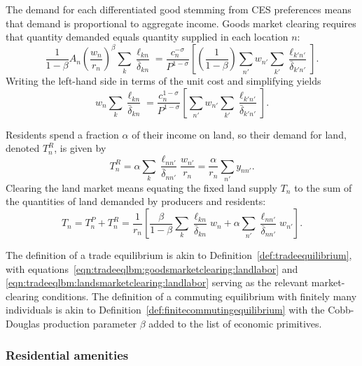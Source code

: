 \documentclass[11pt]{article}
\theoremstyle{definition}
\begin{document}
The demand for each differentiated good stemming from CES preferences means that
demand is proportional to aggregate income.
Goods market clearing requires that quantity demanded equals quantity supplied in each location $n$:
\begin{equation*}
    \frac{1}{1-\beta} A_n \left(\frac{w_n}{r_n}\right)^{\beta} \sum_k \frac{\ell_{kn}}{\bar{\delta}_{kn}}
    =
    \frac{c_n^{-\sigma}}{P^{1-\sigma}} \left[\left(\frac{1}{1-\beta}\right) \sum_{n'} w_{n'} \sum_{k'} \frac{\ell_{k'n'}}{\bar{\delta}_{k'n'}} \right].
\end{equation*}
Writing the left-hand side in terms of the unit cost and simplifying yields
\begin{equation}
	\label{eqn:tradeeqlbm:goodsmarketclearing:landlabor}
    w_n \sum_k \frac{\ell_{kn}}{\bar{\delta}_{kn}}
    =
    \frac{c_n^{1-\sigma}}{P^{1-\sigma}} \left[\sum_{n'} w_{n'} \sum_{k'} \frac{\ell_{k'n'}}{\bar{\delta}_{k'n'}} \right].
\end{equation}

Residents spend a fraction $\alpha$ of their income on land, so their demand for land,
denoted $T_n^R$, is given by
\begin{equation*}
    T_n^R = \alpha \sum_k \frac{\ell_{nn'}}{\bar{\delta}_{nn'}} \frac{w_{n'}}{r_n} = \frac{\alpha}{r_{n}} \sum_{n'} y_{nn'}
.\end{equation*}
Clearing the land market means
equating the fixed land supply $T_n$ to the sum of the quantities of land demanded by producers and residents:
\begin{equation}
	\label{eqn:tradeeqlbm:landsmarketclearing:landlabor}
    T_n = T_n^P + T_n^R
    = \frac{1}{r_n} \left[\frac{\beta}{1-\beta} \sum_k \frac{\ell_{kn}}{\bar{\delta}_{kn}} w_n
    + \alpha \sum_{n'} \frac{\ell_{nn'}}{\bar{\delta}_{nn'}} w_{n'} \right].
\end{equation}

The definition of a trade equilibrium is akin to Definition~\ref{def:tradeequilibrium},
with equations~\eqref{eqn:tradeeqlbm:goodsmarketclearing:landlabor} and \eqref{eqn:tradeeqlbm:landsmarketclearing:landlabor}
serving as the relevant market-clearing conditions.
The definition of a commuting equilibrium with finitely many individuals is akin to Definition~\ref{def:finitecommutingequilibrium} with the Cobb-Douglas production parameter $\beta$ added to the list of economic primitives.

\subsubsection{Residential amenities}\label{sec:appendix:theory:amenities}
\end{document}
